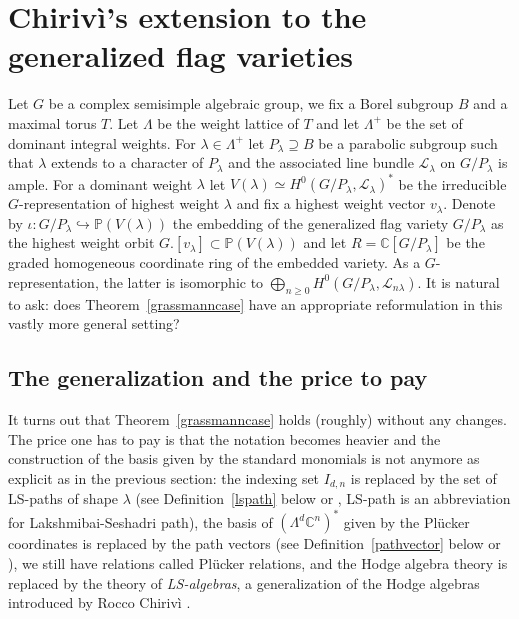 \documentclass{emsprocart}
\theoremstyle{definition}
\begin{document}
\section{Chiriv\`i's extension to the generalized flag varieties}\label{Section:Chiviri}
Let $G$ be a complex semisimple algebraic group, we fix a Borel subgroup $B$ and a maximal torus $T$. Let $\Lambda$ be the weight lattice of $T$ and 
let $\Lambda^+$ be the set of dominant integral weights.
For $\lambda\in \Lambda^+$ let $P_\lambda\supseteq B$ be a parabolic subgroup such that $\lambda$ extends to a character of $P_\lambda$
and the associated line bundle $\mathcal L_\lambda$ on $G/P_\lambda$ is ample.
For a dominant weight $\lambda$ let $V(\lambda)\simeq H^0(G/P_\lambda,\mathcal L_\lambda)^*$  be the irreducible $G$-representation
of highest weight $\lambda$ and fix a highest weight vector $v_\lambda$. 
Denote by $\iota:G/P_\lambda\hookrightarrow \mathbb P(V(\lambda))$ the embedding of the generalized flag variety $G/P_\lambda$
as the highest weight orbit $G.[v_\lambda]\subset \mathbb P(V(\lambda))$ and let $R=\mathbb C[G/P_\lambda]$  be the graded homogeneous
coordinate ring of the embedded variety. As a $G$-representation, the latter is isomorphic to
$\bigoplus_{n\ge 0} H^0(G/P_\lambda,\mathcal L_{n\lambda})$.
It is natural to ask: does Theorem~\ref{grassmanncase} have an appropriate reformulation in this vastly more general setting?

\subsection{The generalization and the price to pay} It turns out that Theorem~\ref{grassmanncase} holds (roughly) without any changes. The price one has to pay is that the notation becomes
heavier and the construction of the basis given by the standard monomials is not anymore as explicit as in the previous section:
the indexing set $I_{d,n}$ is replaced by the set of LS-paths of shape $\lambda$ (see Definition~\ref{lspath} below or \cite{L1}, LS-path is an abbreviation for 
Lakshmibai-Seshadri path),
the basis of $(\Lambda^d\mathbb C^n)^*$ given by the Pl\"ucker coordinates is replaced by the path vectors (see Definition~\ref{pathvector} below or \cite{L2}),
we still have relations called Pl\"ucker relations, and the
Hodge algebra theory is replaced by the theory of {\it LS-algebras}, a generalization of the Hodge algebras introduced by
Rocco Chiriv\`i \cite{Ch1}.
\end{document}
